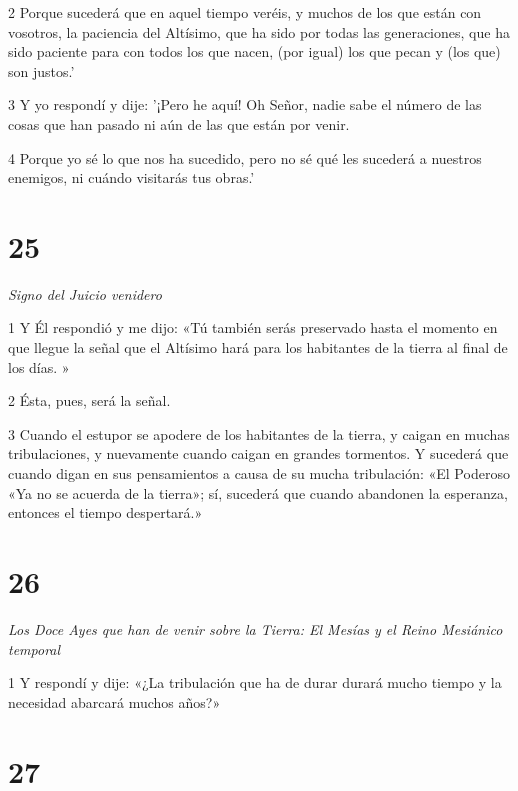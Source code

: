 \par 2 Porque sucederá que en aquel tiempo veréis, y muchos de los que están con vosotros, la paciencia del Altísimo, que ha sido por todas las generaciones, que ha sido paciente para con todos los que nacen, (por igual) los que pecan y (los que) son justos.'

\par 3 Y yo respondí y dije: '¡Pero he aquí! Oh Señor, nadie sabe el número de las cosas que han pasado ni aún de las que están por venir.

\par 4 Porque yo sé lo que nos ha sucedido, pero no sé qué les sucederá a nuestros enemigos, ni cuándo visitarás tus obras.'

\chapter{25}

\par \textit{Signo del Juicio venidero}

\par 1 Y Él respondió y me dijo: «Tú también serás preservado hasta el momento en que llegue la señal que el Altísimo hará para los habitantes de la tierra al final de los días. »

\par 2 Ésta, pues, será la señal.

\par 3 Cuando el estupor se apodere de los habitantes de la tierra, y caigan en muchas tribulaciones, y nuevamente cuando caigan en grandes tormentos. Y sucederá que cuando digan en sus pensamientos a causa de su mucha tribulación: «El Poderoso «Ya no se acuerda de la tierra»; sí, sucederá que cuando abandonen la esperanza, entonces el tiempo despertará.»

\chapter{26}

\par \textit{Los Doce Ayes que han de venir sobre la Tierra: El Mesías y el Reino Mesiánico temporal}

\par 1 Y respondí y dije: «¿La tribulación que ha de durar durará mucho tiempo y la necesidad abarcará muchos años?»

\chapter{27}

